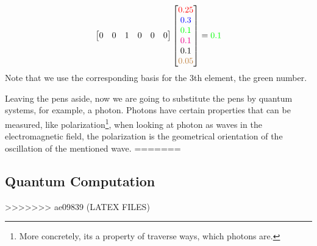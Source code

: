 $$
\begin{bmatrix}
	0 & 0 & 1 & 0 & 0 & 0\\
\end{bmatrix}
\begin{bmatrix}
	\textcolor{red}{0.25} \\
	\textcolor{blue}{0.3 }\\
	\textcolor{green}{0.1 }\\
	\textcolor{magenta}{0.1 }\\
	\textcolor{black}{0.1 }\\
	\textcolor{brown}{0.05}
\end{bmatrix} = \textcolor{green}{0.1 }
$$
Note that we use the corresponding basis for the 3th element, the green number.

Leaving the pens aside, now we are going to substitute the pens by quantum systems, for example, a photon. Photons have certain properties that can be measured, like polarization\footnote{More concretely, its a property of traverse ways, which photons are.}, when looking at photon as waves in the electromagnetic field, the polarization is the geometrical orientation of the oscillation of the mentioned wave.
=======

\subsection{Quantum Computation}

>>>>>>> ae09839 (LATEX FILES)
